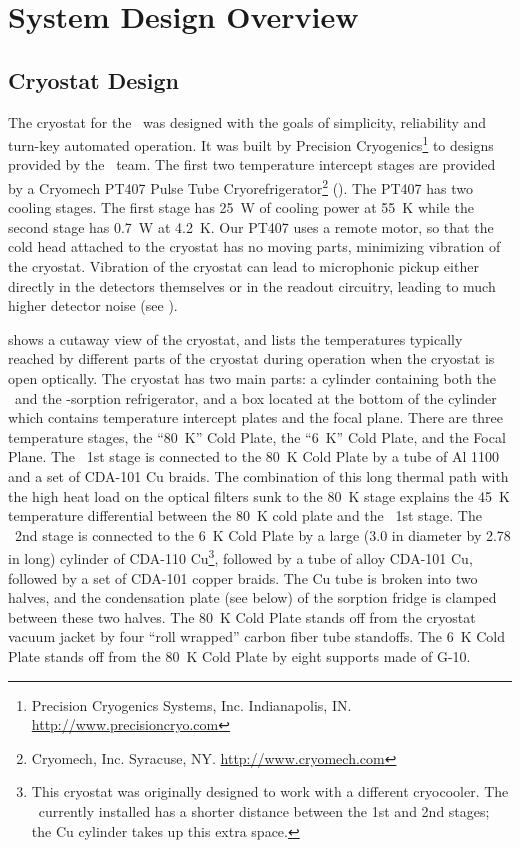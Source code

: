 \chapter{System Design Overview}\label{c:sys-design}

\section{Cryostat Design}\label{sec:ch4-cryo-design}

The cryostat for the \Imager\ was designed with the goals of simplicity, reliability and turn-key automated operation.
It was built by Precision Cryogenics\footnote{Precision Cryogenics Systems, Inc. Indianapolis, IN. \url{http://www.precisioncryo.com}} to designs provided by the \Imager\ team.
The first two temperature intercept stages are provided by a Cryomech PT407 Pulse Tube Cryorefrigerator\footnote{Cryomech, Inc. Syracuse, NY. \url{http://www.cryomech.com}} (\PTC).
The PT407 has two cooling stages.
The first stage has \SI{25}{\W} of cooling power at \SI{55}{\K} while the second stage has \SI{0.7}{\W} at \SI{4.2}{\K}.
Our PT407 uses a remote motor, so that the cold head attached to the cryostat has no moving parts, minimizing vibration of the cryostat.
Vibration of the cryostat can lead to microphonic pickup either directly in the detectors themselves or in the readout circuitry, leading to much higher detector noise (see ).

 shows a cutaway view of the cryostat, and  lists the temperatures typically reached by different parts of the cryostat during operation when the cryostat is open optically.
The cryostat has two main parts: a cylinder containing both the \PTC\ and the -sorption refrigerator, and a box located at the bottom of the cylinder which contains temperature intercept plates and the focal plane.
There are three temperature stages, the ``\SI{80}{\K}'' Cold Plate, the ``\SI{6}{\K}'' Cold Plate, and the Focal Plane.
The \PTC\ 1st stage is connected to the \SI{80}{\K} Cold Plate by a tube of Al 1100 and a set of CDA-101 Cu braids.
The combination of this long thermal path with the high heat load on the optical filters sunk to the \SI{80}{\K} stage explains the \SI{45}{\K} temperature differential between the \SI{80}{\K} cold plate and the \PTC\ 1st stage.
The \PTC\ 2nd stage is connected to the \SI{6}{K} Cold Plate by a large (3.0 in diameter by 2.78 in long) cylinder of CDA-110 Cu\footnote{This cryostat was originally designed to work with a different cryocooler. The \PTC\ currently installed has a shorter distance between the 1st and 2nd stages; the Cu cylinder takes up this extra space.}, followed by a tube of alloy CDA-101 Cu, followed by a set of  CDA-101 copper braids.
The Cu tube is broken into two halves, and the condensation plate (see below) of the sorption fridge is clamped between these two halves.
The \SI{80}{\K} Cold Plate stands off from the cryostat vacuum jacket by four ``roll wrapped'' carbon fiber tube standoffs.
The \SI{6}{\K} Cold Plate stands off from the \SI{80}{\K} Cold Plate by eight supports made of G-10.

